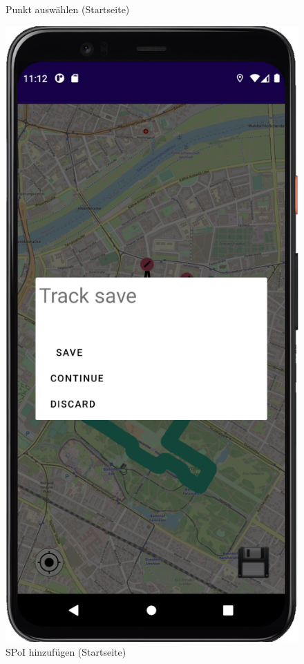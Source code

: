 \documentclass{article}
\begin{document}
\begin{enumerate}
\begin{figure}[H]
		  		\centering
				\caption{Punkt auswählen (Startseite)}
			\endminipage\hfill
		 		\includegraphics[width=\linewidth]{spoi_pic5_2.png}
		 		\centering
				\caption{SPoI hinzufügen (Startseite)}
			\endminipage\hfill
		\end{figure}
	\end{enumerate}
\newpage
\end{document}
